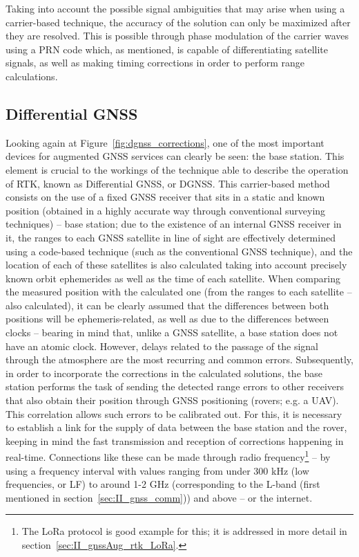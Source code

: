 Taking into account the possible signal ambiguities that may arise when using a carrier-based technique, the accuracy of the solution can only be maximized after they are resolved. This is possible through phase modulation of the carrier waves using a PRN code which, as mentioned, is capable of differentiating satellite signals, as well as making timing corrections in order to perform range calculations.

\subsection{Differential GNSS}\label{sec:II_gnssAug_dgnss}

Looking again at Figure~\ref{fig:dgnss_corrections}, one of the most important devices for augmented GNSS services can clearly be seen: the base station. This element is crucial to the workings of the technique able to describe the operation of RTK, known as Differential GNSS, or DGNSS. This carrier-based method consists on the use of a fixed GNSS receiver that sits in a static and known position (obtained in a highly accurate way through conventional surveying techniques) -- base station; due to the existence of an internal GNSS receiver in it, the ranges to each GNSS satellite in line of sight are effectively determined using a code-based technique (such as the conventional GNSS technique), and the location of each of these satellites is also calculated taking into account precisely known orbit ephemerides as well as the time of each satellite.
When comparing the measured position with the calculated one (from the ranges to each satellite -- also calculated), it can be clearly assumed that the differences between both positions will be ephemeris-related, as well as due to the differences between clocks 
-- bearing in mind that, unlike a GNSS satellite, a base station does not have an atomic clock. However, delays related to the passage of the signal through the atmosphere are the most recurring and common errors.
Subsequently, in order to incorporate the corrections in the calculated solutions, the base station performs the task of sending the detected range errors to other receivers that also obtain their position through GNSS positioning (rovers; e.g. a UAV). This correlation allows such errors to be calibrated out.
For this, it is necessary to establish a link for the supply of data between the base station and the rover, keeping in mind the fast transmission and reception of corrections happening in real-time. Connections like these can be made through radio frequency\footnote{The LoRa protocol is good example for this; it is addressed in more detail in section~\ref{sec:II_gnssAug_rtk_LoRa}.} -- by using a frequency interval with values ranging from under 300 kHz (low frequencies, or LF) to around 1-2 GHz (corresponding to the L-band (first mentioned in section~\ref{sec:II_gnss_comm})) and above -- or the internet.


